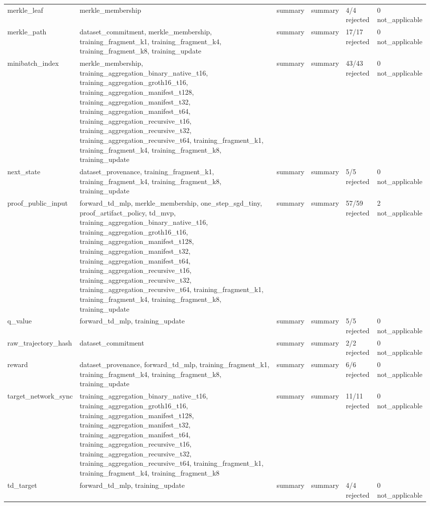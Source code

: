 \begin{table}[t]
\begin{tabular}{llllll}
merkle\_leaf & merkle\_membership & summary & summary & 4/4 rejected & 0 not\_applicable \\
merkle\_path & dataset\_commitment, merkle\_membership, training\_fragment\_k1, training\_fragment\_k4, training\_fragment\_k8, training\_update & summary & summary & 17/17 rejected & 0 not\_applicable \\
minibatch\_index & merkle\_membership, training\_aggregation\_binary\_native\_t16, training\_aggregation\_groth16\_t16, training\_aggregation\_manifest\_t128, training\_aggregation\_manifest\_t32, training\_aggregation\_manifest\_t64, training\_aggregation\_recursive\_t16, training\_aggregation\_recursive\_t32, training\_aggregation\_recursive\_t64, training\_fragment\_k1, training\_fragment\_k4, training\_fragment\_k8, training\_update & summary & summary & 43/43 rejected & 0 not\_applicable \\
next\_state & dataset\_provenance, training\_fragment\_k1, training\_fragment\_k4, training\_fragment\_k8, training\_update & summary & summary & 5/5 rejected & 0 not\_applicable \\
proof\_public\_input & forward\_td\_mlp, merkle\_membership, one\_step\_sgd\_tiny, proof\_artifact\_policy, td\_mvp, training\_aggregation\_binary\_native\_t16, training\_aggregation\_groth16\_t16, training\_aggregation\_manifest\_t128, training\_aggregation\_manifest\_t32, training\_aggregation\_manifest\_t64, training\_aggregation\_recursive\_t16, training\_aggregation\_recursive\_t32, training\_aggregation\_recursive\_t64, training\_fragment\_k1, training\_fragment\_k4, training\_fragment\_k8, training\_update & summary & summary & 57/59 rejected & 2 not\_applicable \\
q\_value & forward\_td\_mlp, training\_update & summary & summary & 5/5 rejected & 0 not\_applicable \\
raw\_trajectory\_hash & dataset\_commitment & summary & summary & 2/2 rejected & 0 not\_applicable \\
reward & dataset\_provenance, forward\_td\_mlp, training\_fragment\_k1, training\_fragment\_k4, training\_fragment\_k8, training\_update & summary & summary & 6/6 rejected & 0 not\_applicable \\
target\_network\_sync & training\_aggregation\_binary\_native\_t16, training\_aggregation\_groth16\_t16, training\_aggregation\_manifest\_t128, training\_aggregation\_manifest\_t32, training\_aggregation\_manifest\_t64, training\_aggregation\_recursive\_t16, training\_aggregation\_recursive\_t32, training\_aggregation\_recursive\_t64, training\_fragment\_k1, training\_fragment\_k4, training\_fragment\_k8 & summary & summary & 11/11 rejected & 0 not\_applicable \\
td\_target & forward\_td\_mlp, training\_update & summary & summary & 4/4 rejected & 0 not\_applicable \\
\bottomrule
\end{tabular}
\end{table}
